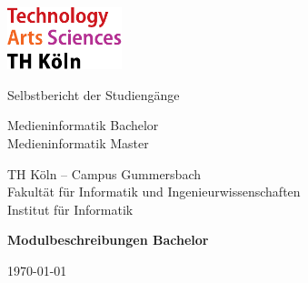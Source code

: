 
\begin{titlepage}

	\includegraphics[width=0.25\textwidth]{../../../assets/logo_th_koeln.pdf}

	\vspace{2cm}
	{\Large\raggedright Selbstbericht der Studiengänge\par}
	\vspace{-1cm}
	{\Huge\singlespacing Medieninformatik Bachelor \\ Medieninformatik Master \par}
	\vspace{1cm}
	{\Large TH Köln – Campus Gummersbach \\ Fakultät für Informatik und Ingenieurwissenschaften \\ Institut für Informatik\par}
	\vspace{1.5cm}
	{\huge\bfseries Modulbeschreibungen Bachelor\par}

	\vfill

	{\large \today\par}
\end{titlepage}
